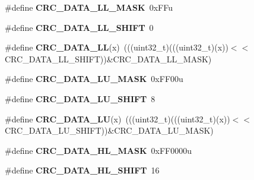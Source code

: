\begin{DoxyCompactItemize}
\item 
\#define {\bfseries C\+R\+C\+\_\+\+D\+A\+T\+A\+\_\+\+L\+L\+\_\+\+M\+A\+SK}~0x\+F\+Fu\hypertarget{group__CRC__Register__Masks_gab3fd3443e50946adc0be6c46cfac2b4d}{}\label{group__CRC__Register__Masks_gab3fd3443e50946adc0be6c46cfac2b4d}

\item 
\#define {\bfseries C\+R\+C\+\_\+\+D\+A\+T\+A\+\_\+\+L\+L\+\_\+\+S\+H\+I\+FT}~0\hypertarget{group__CRC__Register__Masks_gaf8ecef51d22d384bc8ab987dfb808f49}{}\label{group__CRC__Register__Masks_gaf8ecef51d22d384bc8ab987dfb808f49}

\item 
\#define {\bfseries C\+R\+C\+\_\+\+D\+A\+T\+A\+\_\+\+LL}(x)~(((uint32\+\_\+t)(((uint32\+\_\+t)(x))$<$$<$C\+R\+C\+\_\+\+D\+A\+T\+A\+\_\+\+L\+L\+\_\+\+S\+H\+I\+FT))\&C\+R\+C\+\_\+\+D\+A\+T\+A\+\_\+\+L\+L\+\_\+\+M\+A\+SK)\hypertarget{group__CRC__Register__Masks_ga5c2d2d988b40b375080e1e6e63ba3f77}{}\label{group__CRC__Register__Masks_ga5c2d2d988b40b375080e1e6e63ba3f77}

\item 
\#define {\bfseries C\+R\+C\+\_\+\+D\+A\+T\+A\+\_\+\+L\+U\+\_\+\+M\+A\+SK}~0x\+F\+F00u\hypertarget{group__CRC__Register__Masks_ga270ddfffb4376c63d7dcb6c67ec26ac0}{}\label{group__CRC__Register__Masks_ga270ddfffb4376c63d7dcb6c67ec26ac0}

\item 
\#define {\bfseries C\+R\+C\+\_\+\+D\+A\+T\+A\+\_\+\+L\+U\+\_\+\+S\+H\+I\+FT}~8\hypertarget{group__CRC__Register__Masks_ga1ff4f24e49d987429fc4bf9515a37d40}{}\label{group__CRC__Register__Masks_ga1ff4f24e49d987429fc4bf9515a37d40}

\item 
\#define {\bfseries C\+R\+C\+\_\+\+D\+A\+T\+A\+\_\+\+LU}(x)~(((uint32\+\_\+t)(((uint32\+\_\+t)(x))$<$$<$C\+R\+C\+\_\+\+D\+A\+T\+A\+\_\+\+L\+U\+\_\+\+S\+H\+I\+FT))\&C\+R\+C\+\_\+\+D\+A\+T\+A\+\_\+\+L\+U\+\_\+\+M\+A\+SK)\hypertarget{group__CRC__Register__Masks_ga567014ec3cf8760d4e4502866c31ef00}{}\label{group__CRC__Register__Masks_ga567014ec3cf8760d4e4502866c31ef00}

\item 
\#define {\bfseries C\+R\+C\+\_\+\+D\+A\+T\+A\+\_\+\+H\+L\+\_\+\+M\+A\+SK}~0x\+F\+F0000u\hypertarget{group__CRC__Register__Masks_ga4d36f0e2640b258579276ada9dbc68b1}{}\label{group__CRC__Register__Masks_ga4d36f0e2640b258579276ada9dbc68b1}

\item 
\#define {\bfseries C\+R\+C\+\_\+\+D\+A\+T\+A\+\_\+\+H\+L\+\_\+\+S\+H\+I\+FT}~16\hypertarget{group__CRC__Register__Masks_gae717e6022d6dd5e4e72cc3386e7ccc6b}{}\label{group__CRC__Register__Masks_gae717e6022d6dd5e4e72cc3386e7ccc6b}


\end{DoxyCompactItemize}
